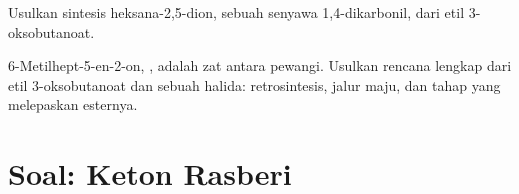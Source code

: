 \begin{exercise}[$\star\star\star$]\label{exo:b2:retrosynthesis:11}
Usulkan sintesis heksana-2,5-dion, sebuah senyawa 1,4-dikarbonil, dari etil 3-oksobutanoat.
\end{exercise}

\begin{exercise}[$\star\star\star$]\label{exo:b2:retrosynthesis:12}
6-Metilhept-5-en-2-on, , adalah zat antara
pewangi. Usulkan rencana lengkap dari etil 3-oksobutanoat dan sebuah halida:
retrosintesis, jalur maju, dan tahap yang melepaskan esternya.
\end{exercise}

\section{Soal: Keton Rasberi}

